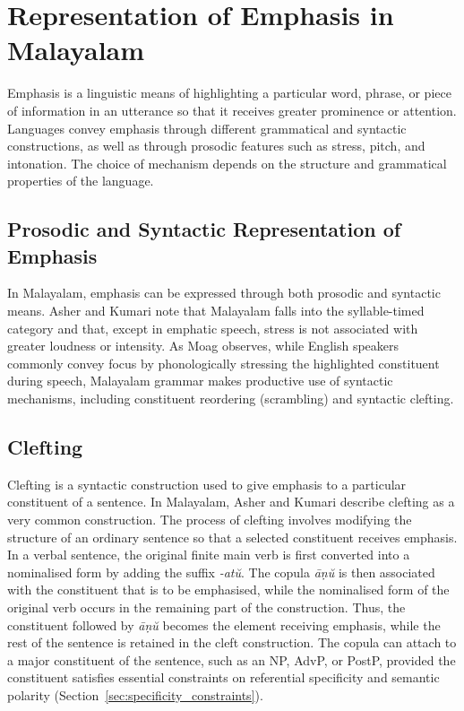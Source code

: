 \chapter{Representation of Emphasis in Malayalam}
\label{chap:introduction}

Emphasis is a linguistic means of highlighting a particular word, phrase, or piece of information in an utterance so that it receives greater prominence or attention. Languages convey emphasis through different grammatical and syntactic constructions, as well as through prosodic features such as stress, pitch, and intonation. The choice of mechanism depends on the structure and grammatical properties of the language.

\section{Prosodic and Syntactic Representation of Emphasis}

In Malayalam, emphasis can be expressed through both prosodic and syntactic means. Asher and Kumari \citep{asher1997malayalam} note that Malayalam falls into the syllable-timed category and that, except in emphatic speech, stress is not associated with greater loudness or intensity. As Moag \citep{moag2002malayalam} observes, while English speakers commonly convey focus by phonologically stressing the highlighted constituent during speech, Malayalam grammar makes productive use of syntactic mechanisms, including constituent reordering (scrambling) and syntactic clefting.

\section{Clefting}

Clefting is a syntactic construction used to give emphasis to a particular constituent of a sentence. In Malayalam, Asher and Kumari \citep{asher1997malayalam} describe clefting as a very common construction. The process of clefting involves modifying the structure of an ordinary sentence so that a selected constituent receives emphasis. In a verbal sentence, the original finite main verb is first converted into a nominalised form by adding the suffix \textit{-atŭ}. The copula \textit{āṇŭ} is then associated with the constituent that is to be emphasised, while the nominalised form of the original verb occurs in the remaining part of the construction. Thus, the constituent followed by \textit{āṇŭ} becomes the element receiving emphasis, while the rest of the sentence is retained in the cleft construction. The copula can attach to a major constituent of the sentence, such as an NP, AdvP, or PostP, provided the constituent satisfies essential constraints on referential specificity and semantic polarity (Section~\ref{sec:specificity_constraints}).

